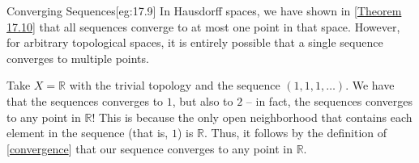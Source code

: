 \begin{egBox}{Converging Sequences}[eg:17.9]
    In Hausdorff spaces, we have shown in [\hyperlink{thm:17.10}{Theorem 17.10}]
    that all sequences converge to at most one point in that space.
    However, for arbitrary topological spaces, it is entirely possible that 
    a single sequence converges to multiple points.

    \baseSkip

    Take \( X = \mathbb{R} \) with the trivial topology and the sequence 
    \( ( 1, 1, 1, \ldots ) \).
    We have that the sequences converges to \( 1 \), but also to \( 2 \) --
    in fact, the sequences converges to any point in \( \mathbb{R} \)!
    This is because the only open neighborhood that contains each element in the
    sequence (that is, \( 1 \)) is \( \mathbb{R} \).
    Thus, it follows by the definition of [\hyperlink{def:17:converge}
    {convergence}] that our sequence converges to any point in \( \mathbb{R} \).
\end{egBox}